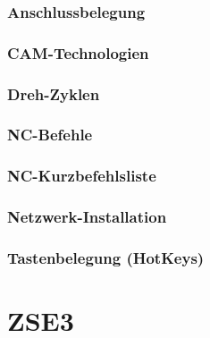 \documentclass[14pt,a4paper]{book}
\begin{document}
	\section{Anschlussbelegung} 
	\section{CAM-Technologien} 
	\section{Dreh-Zyklen} 
	\section{NC-Befehle} 
	\section{NC-Kurzbefehlsliste} 
	\section{Netzwerk-Installation} 
	\section{Tastenbelegung (HotKeys)} 
 
 
\part{ZSE3}
\end{document}
